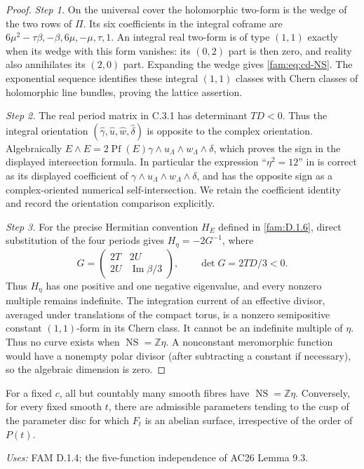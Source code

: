 \begin{proof}
\par\noindent\textit{Step 1.} On the universal cover the holomorphic two-form is the wedge of the two
rows of \(\Pi\). Its six coefficients in the integral coframe are
\(6\mu^2-\tau\beta,-\beta,6\mu,-\mu,\tau,1\).
An integral real two-form is of type \((1,1)\) exactly when its wedge
with this form vanishes: its \((0,2)\) part is then zero, and reality
also annihilates its \((2,0)\) part. Expanding the wedge gives
\eqref{fam:eq:cd-NS}. The exponential sequence identifies these integral
\((1,1)\) classes with Chern classes of holomorphic line bundles, proving
the lattice assertion.

\par\noindent\textit{Step 2.} The real period matrix in C.3.1 has determinant \(TD<0\). Thus the
integral orientation \((\widehat\gamma,\widehat u,\widehat w,
\widehat\delta)\) is opposite to the complex orientation. Algebraically
\(E\wedge E=2\operatorname{Pf}(E)\gamma\wedge u_{\Lambda}\wedge w_{\Lambda}\wedge\delta\),
which proves the sign in the displayed intersection formula. In
particular the expression ``\(\eta^2=12\)'' in \cite[Lemma~9.4]{AC26} is correct
as its displayed coefficient of \(\gamma\wedge u_{\Lambda}\wedge w_{\Lambda}\wedge\delta\),
and has the opposite sign as a complex-oriented numerical
self-intersection. We retain the coefficient identity and record the
orientation comparison explicitly.

\par\noindent\textit{Step 3.} For the precise Hermitian convention $H_E$ defined in \ref{fam:D.1.6}, direct
substitution of the four periods gives $H_\eta=-2G^{-1}$, where
\[
 G=\begin{pmatrix}2T&2U\\2U&\operatorname{Im}\beta/3\end{pmatrix},
 \qquad \det G=2TD/3<0.
\]
Thus $H_\eta$ has one positive and one negative eigenvalue, and every
nonzero multiple remains indefinite. The integration
current of an effective divisor, averaged under translations of the
compact torus, is a nonzero semipositive constant \((1,1)\)-form in its
Chern class. It cannot be an indefinite multiple of \(\eta\).
Thus no curve exists when \(\operatorname{NS}=\mathbb Z\eta\).
A nonconstant meromorphic function would have a nonempty polar divisor
(after subtracting a constant if necessary), so the algebraic dimension
is zero.
\end{proof}

\begin{proposition}[FAM D.1.5; T]\label{fam:D.1.5}
For a fixed \(c\), all but countably many smooth fibres have
\(\operatorname{NS}=\mathbb Z\eta\). Conversely, for every fixed smooth
\(t\), there are admissible parameters tending to the cusp of the
parameter disc for which \(F_t\) is an abelian surface, irrespective of
the order of \(P(t)\).
\end{proposition}
\noindent\emph{Uses:} FAM D.1.4; the five-function independence of AC26 Lemma 9.3.\par

